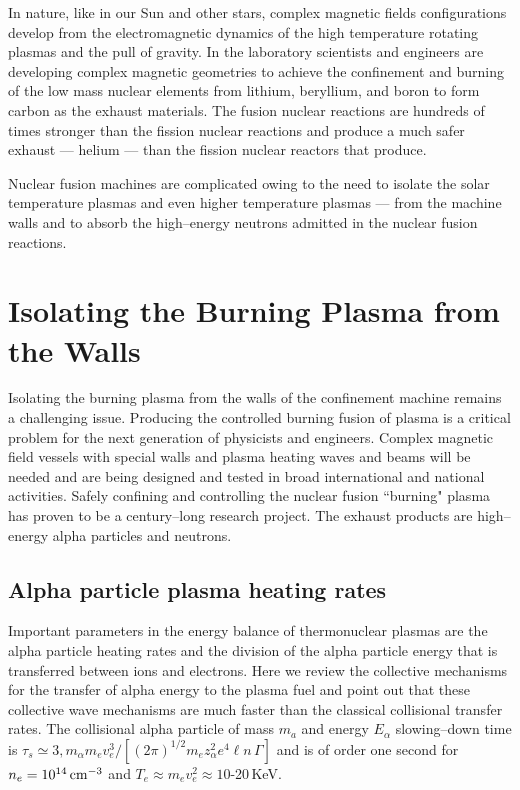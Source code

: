 \documentclass[a4paper,openany,12pt]{book}
\begin{document}
In nature, like in our Sun and other stars, complex magnetic fields configurations develop from the electromagnetic dynamics of the high temperature rotating plasmas and the pull of gravity. In the laboratory scientists and engineers are developing complex magnetic geometries to achieve the confinement and burning of the low mass nuclear elements from lithium, beryllium, and boron to form carbon as the exhaust materials. The fusion nuclear reactions are hundreds of times stronger than the fission nuclear reactions and produce a much safer exhaust --- helium --- than the fission nuclear reactors that produce. 

Nuclear fusion machines are complicated owing to the need to isolate the solar temperature plasmas and even higher temperature plasmas --- from the machine walls and to absorb the high--energy neutrons admitted in the nuclear fusion reactions.

\section{Isolating the Burning Plasma from the Walls}

Isolating the burning plasma from the walls of the confinement machine remains a challenging issue. Producing the controlled burning fusion of plasma is a critical problem for the next generation of physicists and engineers. Complex magnetic field vessels with special walls and plasma heating waves and beams will be needed and are being designed and tested in broad international and national activities. Safely confining and controlling the nuclear fusion ``burning" plasma has proven to be a century--long research project. The exhaust products are high--energy alpha particles and neutrons.

\subsection{Alpha particle plasma heating rates}

Important parameters in the energy balance of thermonuclear plasmas are the alpha particle heating rates and the division of the alpha particle energy that is transferred between ions and electrons. Here we review the collective mechanisms for the transfer of alpha energy to the plasma fuel and point out that these collective wave mechanisms are much faster than the classical collisional transfer rates. The collisional alpha particle of mass $m_a$ and energy $E_\alpha$ slowing--down time is $\tau_s\simeq 3,m_\alpha m_e v^3_e/[(2\pi)^{1/2} m_e z_\alpha^2 e^4\ell n\,\Gamma]$ and is of order one second for $n_e = 10^{14}\,\rm cm^{-3}$ and $T_e\approx m_e v_e^2\approx 10$-20$\,$KeV.
\end{document}
